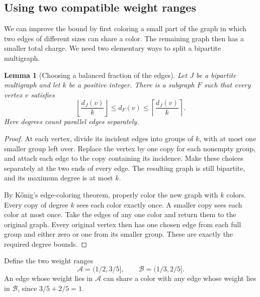 \documentclass[11pt]{article}
\newtheorem{lemma}[theorem]{Lemma}
\theoremstyle{definition}\newtheorem{algorithm}{Algorithm}[section]
\numberwithin{equation}{section}
\theoremstyle{remark}\newtheorem*{remark}{Remark}
\begin{document}
\subsection{Using two compatible weight ranges}
\label{sec:compatible-ranges}

We can improve the bound by first coloring a small part of the graph in
which two edges of different sizes can share a color. The remaining graph
then has a smaller total charge. We need two elementary ways to split a
bipartite multigraph.

\begin{lemma}[Choosing a balanced fraction of the edges]\label{lem:balanced-fraction}
Let $J$ be a bipartite multigraph and let $k$ be a positive integer. There
is a subgraph $F$ such that every vertex $v$ satisfies
\[
 \left\lfloor\frac{d_J(v)}k\right\rfloor
 \le d_F(v)\le
 \left\lceil\frac{d_J(v)}k\right\rceil.
\]
Here degrees count parallel edges separately.
\end{lemma}
\begin{proof}
At each vertex, divide its incident edges into groups of $k$, with at most
one smaller group left over. Replace the vertex by one copy for each
nonempty group, and attach each edge to the copy containing its incidence.
Make these choices separately at the two ends of every edge. The resulting
graph is still bipartite, and its maximum degree is at most $k$.

By K\H{o}nig's edge-coloring theorem, properly color the new graph with
$k$ colors. Every copy of degree $k$ sees each color exactly once. A
smaller copy sees each color at most once. Take the edges of any one
color and return them to the original graph. Every original vertex then
has one chosen edge from each full group and either zero or one from its
smaller group. These are exactly the required degree bounds.
\end{proof}

Define the two weight ranges
\[
 \mathcal A=(1/2,3/5],\qquad
 \mathcal B=(1/3,2/5].
\]
An edge whose weight lies in $\mathcal A$ can share a color with any edge
whose weight lies in $\mathcal B$, since $3/5+2/5=1$.
\end{document}
